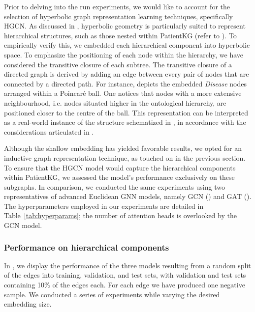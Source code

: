 Prior to delving into the run experiments, we would like to account for the selection of hyperbolic graph representation learning techniques, specifically HGCN. As discussed in , hyperbolic geometry is particularly suited to represent hierarchical structures, such as those nested within PatientKG (refer to ). To empirically verify this, we embedded each hierarchical component into hyperbolic space. To emphasize the positioning of each node within the hierarchy, we have considered the transitive closure of each subtree. The transitive closure of a directed graph is derived by adding an edge between every pair of nodes that are connected by a directed path. For instance,  depicts the embedded \emph{Disease} nodes arranged within a Poincaré ball. One notices that nodes with a more extensive neighbourhood, i.e. nodes situated higher in the ontological hierarchy, are positioned closer to the centre of the ball. This representation can be interpreted as a real-world instance of the structure schematized in , in accordance with the considerations articulated in . 


Although the shallow embedding has yielded favorable results, we opted for an inductive graph representation technique, as touched on in the previous section. To ensure that the HGCN model would capture the hierarchical components within PatientKG, we assessed the model's performance exclusively on these subgraphs. In comparison, we conducted the same experiments using two representatives of advanced Euclidean GNN models, namely GCN () and GAT (). The hyperparameters employed in our experiments are detailed in Table~\ref{tab:hyperparams}; the number of attention heads is overlooked by the GCN model. 

\subsubsection{Performance on hierarchical components}

In , we display the performance of the three models resulting from a random split of the edges into training, validation, and test sets, with validation and test sets containing 10\% of the edges each. For each edge we have produced one negative sample. We conducted a series of experiments while varying the desired embedding size. 

